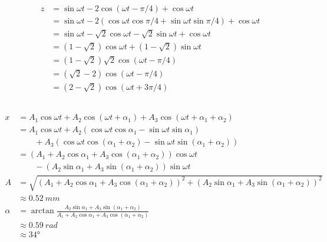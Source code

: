 \documentclass{article}
\begin{document}
\begin{enumerate}
        \begin{align*}
          z & = \sin \omega t - 2 \cos (\omega t - \pi / 4) + \cos \omega t                                 \\
            & = \sin \omega t - 2 (\cos \omega t \cos \pi / 4 + \sin \omega t \sin \pi / 4) + \cos \omega t \\
            & = \sin \omega t - \sqrt{2} \cos \omega t - \sqrt{2} \sin \omega t + \cos \omega t             \\
            & = (1 - \sqrt{2}) \cos \omega t + (1 - \sqrt{2}) \sin \omega t                                 \\
            & = (1 - \sqrt{2}) \sqrt{2} \cos (\omega t - \pi / 4)                                           \\
            & = (\sqrt{2} - 2) \cos (\omega t - \pi / 4)                                                    \\
            & = (2 - \sqrt{2}) \cos (\omega t + 3 \pi / 4)
        \end{align*}
\end{enumerate}

\subsection{}

\begin{align*}
  x      & = A_1 \cos \omega t + A_2 \cos (\omega t + \alpha_1) + A_3 \cos (\omega t + \alpha_1 + \alpha_2)                               \\
         & = A_1 \cos \omega t + A_2 (\cos \omega t \cos \alpha_1 - \sin \omega t \sin \alpha_1)                                          \\
         & \qquad + A_3 (\cos \omega t \cos (\alpha_1 + \alpha_2) - \sin \omega t \sin (\alpha_1 + \alpha_2))                             \\
         & = (A_1 + A_2 \cos \alpha_1 + A_3 \cos (\alpha_1 + \alpha_2)) \cos \omega t                                                     \\
         & \qquad - (A_2 \sin \alpha_1 + A_3 \sin (\alpha_1 + \alpha_2)) \sin \omega t                                                    \\
  A      & = \sqrt{(A_1 + A_2 \cos \alpha_1 + A_3 \cos (\alpha_1 + \alpha_2))^2 + (A_2 \sin \alpha_1 + A_3 \sin (\alpha_1 + \alpha_2))^2} \\
         & \approx \qty{0.52}{mm}                                                                                                         \\
  \alpha & = \arctan \frac{A_2 \sin \alpha_1 + A_3 \sin (\alpha_1 + \alpha_2)}{A_1 + A_2 \cos \alpha_1 + A_3 \cos (\alpha_1 + \alpha_2)}  \\
         & \approx \qty{0.59}{rad}                                                                                                        \\
         & \approx \ang{34}
\end{align*}
\end{document}
